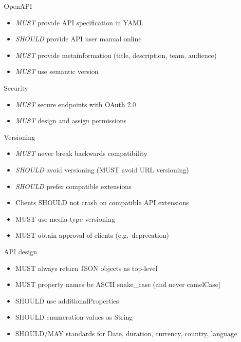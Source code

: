 \documentclass[10pt]{beamer}
\begin{document}
\begin{frame}{OpenAPI}

  \begin{itemize}
    \item \emph{MUST} provide API specification in YAML
    \item \emph{SHOULD} provide API user manual online
    \item \emph{MUST} provide metainformation (title, description, team, audience)
    \item \emph{MUST} use semantic version
  \end{itemize}

\end{frame}

\begin{frame}{Security}

  \begin{itemize}

    \item
          \emph{MUST} secure endpoints with OAuth 2.0
    \item
          \emph{MUST} design and assign permissions
  \end{itemize}

\end{frame}

\begin{frame}{Versioning}

  \begin{itemize}

    \item
          \emph{MUST} never break backwards compatibility
    \item
          \emph{SHOULD} avoid versioning (MUST avoid URL versioning)
    \item
          \emph{SHOULD} prefer compatible extensions
    \item
          Clients SHOULD not crash on compatible API extensions
    \item
          MUST use media type versioning
    \item
          MUST obtain approval of clients (e.g.~deprecation)
  \end{itemize}

\end{frame}

\begin{frame}{API design}

  \begin{itemize}

    \item
          MUST always return JSON objects as top-level
    \item
          MUST property names be ASCII snake\_case (and never camelCase)
    \item
          SHOULD use additionalProperties
    \item
          SHOULD enumeration values as String
    \item
          SHOULD/MAY standards for Date, duration, currency, country, language
  \end{itemize}

\end{frame}
\end{document}
